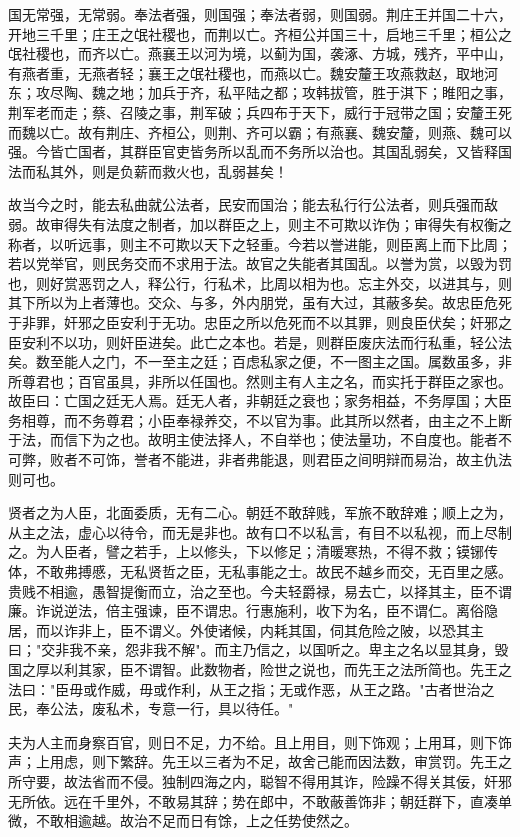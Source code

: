 \documentclass[]{article}
\begin{document}
国无常强，无常弱。奉法者强，则国强；奉法者弱，则国弱。荆庄王并国二十六，开地三千里；庄王之氓社稷也，而荆以亡。齐桓公并国三十，启地三千里；桓公之氓社稷也，而齐以亡。燕襄王以河为境，以蓟为国，袭涿、方城，残齐，平中山，有燕者重，无燕者轻；襄王之氓社稷也，而燕以亡。魏安釐王攻燕救赵，取地河东；攻尽陶、魏之地；加兵于齐，私平陆之都；攻韩拔管，胜于淇下；睢阳之事，荆军老而走；蔡、召陵之事，荆军破；兵四布于天下，威行于冠带之国；安釐王死而魏以亡。故有荆庄、齐桓公，则荆、齐可以霸；有燕襄、魏安釐，则燕、魏可以强。今皆亡国者，其群臣官吏皆务所以乱而不务所以治也。其国乱弱矣，又皆释国法而私其外，则是负薪而救火也，乱弱甚矣！

故当今之时，能去私曲就公法者，民安而国治；能去私行行公法者，则兵强而敌弱。故审得失有法度之制者，加以群臣之上，则主不可欺以诈伪；审得失有权衡之称者，以听远事，则主不可欺以天下之轻重。今若以誉进能，则臣离上而下比周；若以党举官，则民务交而不求用于法。故官之失能者其国乱。以誉为赏，以毁为罚也，则好赏恶罚之人，释公行，行私术，比周以相为也。忘主外交，以进其与，则其下所以为上者薄也。交众、与多，外内朋党，虽有大过，其蔽多矣。故忠臣危死于非罪，奸邪之臣安利于无功。忠臣之所以危死而不以其罪，则良臣伏矣；奸邪之臣安利不以功，则奸臣进矣。此亡之本也。若是，则群臣废庆法而行私重，轻公法矣。数至能人之门，不一至主之廷；百虑私家之便，不一图主之国。属数虽多，非所尊君也；百官虽具，非所以任国也。然则主有人主之名，而实托于群臣之家也。故臣曰：亡国之廷无人焉。廷无人者，非朝廷之衰也；家务相益，不务厚国；大臣务相尊，而不务尊君；小臣奉禄养交，不以官为事。此其所以然者，由主之不上断于法，而信下为之也。故明主使法择人，不自举也；使法量功，不自度也。能者不可弊，败者不可饰，誉者不能进，非者弗能退，则君臣之间明辩而易治，故主仇法则可也。

贤者之为人臣，北面委质，无有二心。朝廷不敢辞贱，军旅不敢辞难；顺上之为，从主之法，虚心以待令，而无是非也。故有口不以私言，有目不以私视，而上尽制之。为人臣者，譬之若手，上以修头，下以修足；清暖寒热，不得不救；镆铘传体，不敢弗搏慼，无私贤哲之臣，无私事能之士。故民不越乡而交，无百里之感。贵贱不相逾，愚智提衡而立，治之至也。今夫轻爵禄，易去亡，以择其主，臣不谓廉。诈说逆法，倍主强谏，臣不谓忠。行惠施利，收下为名，臣不谓仁。离俗隐居，而以诈非上，臣不谓义。外使诸候，内耗其国，伺其危险之陂，以恐其主曰；"交非我不亲，怨非我不解"。而主乃信之，以国听之。卑主之名以显其身，毁国之厚以利其家，臣不谓智。此数物者，险世之说也，而先王之法所简也。先王之法曰："臣毋或作威，毋或作利，从王之指；无或作恶，从王之路。"古者世治之民，奉公法，废私术，专意一行，具以待任。"

夫为人主而身察百官，则日不足，力不给。且上用目，则下饰观；上用耳，则下饰声；上用虑，则下繁辞。先王以三者为不足，故舍己能而因法数，审赏罚。先王之所守要，故法省而不侵。独制四海之内，聪智不得用其诈，险躁不得关其佞，奸邪无所依。远在千里外，不敢易其辞；势在郎中，不敢蔽善饰非；朝廷群下，直凑单微，不敢相逾越。故治不足而日有馀，上之任势使然之。
\end{document}
